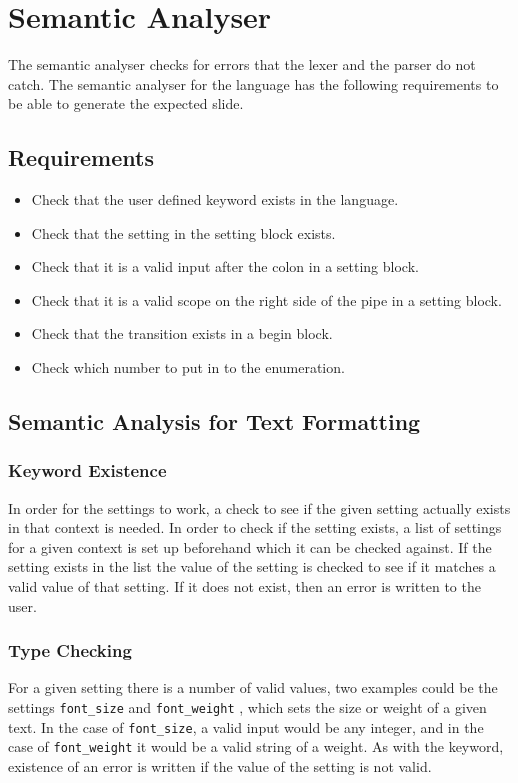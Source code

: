 \chapter{Semantic Analyser}

The semantic analyser checks for errors that the lexer and the parser do not catch. The semantic analyser for the language has the following requirements to be able to generate the expected slide.

\section{Requirements}
\begin{itemize}
	\item Check that the user defined keyword exists in the language.
	\item Check that the setting in the setting block exists.
	\item Check that it is a valid input after the colon in a setting block.
	\item Check that it is a valid scope on the right side of the pipe in a setting block.
	\item Check that the transition exists in a begin block.
	\item Check which number to put in to the enumeration.
\end{itemize}


\section{Semantic Analysis for Text Formatting}

\subsection{Keyword Existence}
In order for the settings to work, a check to see if the given setting actually exists in that context is needed. In order to check if the setting exists, a list of settings for a given context is set up beforehand which it can be checked against. If the setting exists in the list the value of the setting is checked to see if it matches a valid value of that setting. If it does not exist, then an error is written to the user.

\subsection{Type Checking}
For a given setting there is a number of valid values, two examples could be the settings \texttt{font\_size} and \texttt{font\_weight} , which sets the size or weight of a given text. In the case of \texttt{font\_size}, a valid input would be any integer, and in the case of \texttt{font\_weight} it would be a valid string of a weight. As with the keyword, existence of an error is written if the value of the setting is not valid.
     
